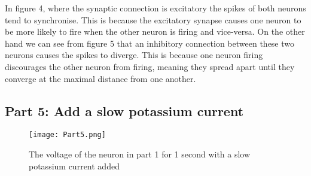 \documentclass[a4paper, 12pt]{article}
\begin{document}
\vspace{5mm}
In figure 4, where the synaptic connection is excitatory the spikes of both neurons tend to synchronise. This is because the excitatory synapse causes one neuron to be more likely to fire when the other neuron is firing and vice-versa. On the other hand we can see from figure 5 that an inhibitory connection between these two neurons causes the spikes to diverge. This is because one neuron firing discourages the other neuron from firing, meaning they spread apart until they converge at the maximal distance from one another.

\subsection*{Part 5: Add a slow potassium current}
\begin{figure}[H]
  \centering
  \texttt{[image: Part5.png]}
  \caption{The voltage of the neuron in part 1 for 1 second with a slow potassium current added}
\end{figure}
\end{document}
